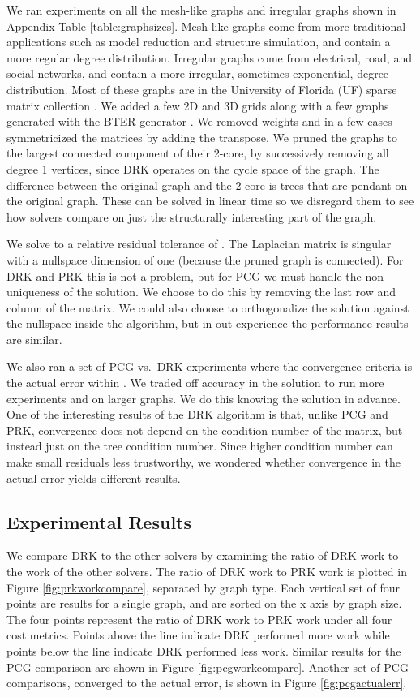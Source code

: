 \documentclass{sig-alternate}
\begin{document}
We ran experiments on all the mesh-like graphs
and irregular graphs shown in Appendix Table \ref{table:graphsizes}.
Mesh-like graphs come from more traditional applications
such as model reduction and
structure simulation, and contain a more regular degree distribution.
Irregular graphs come from electrical, road, and social networks, and
contain a more irregular, sometimes exponential, degree distribution.
Most of these graphs are in the University of Florida (UF)
sparse matrix collection \cite{DavisHu2011}.
We added a few 2D and 3D grids along with a few graphs generated with
the BTER generator \cite{KPPS2014}.
We removed weights and in a few cases symmetricized the matrices by
adding the transpose.
We pruned the graphs to the largest connected component of
their 2-core, by successively removing
all degree 1 vertices, since DRK operates
on the cycle space of the graph.
The difference between the original graph and the 2-core
is trees that are pendant on the original graph. These can be solved in linear
time so we disregard them to see how solvers compare on just
the structurally interesting
part of the graph.



We solve to a relative residual tolerance of .
The Laplacian matrix is singular with a nullspace dimension of one
(because the pruned graph is connected).
For DRK and PRK this is not a problem, but for PCG we must handle
the non-uniqueness of the solution.
We choose to do this
by removing the last row and column of the matrix.
We could also choose to orthogonalize the solution against
the nullspace inside the algorithm, but
in out experience the performance results are similar.


We also
ran a set of PCG vs.\ DRK experiments where the convergence criteria
is the actual error within .
We traded off accuracy in the solution to run more
experiments and on larger graphs.
We do this knowing the solution in advance.
One of the interesting results
of the DRK algorithm is that, unlike PCG and PRK,
convergence does not depend on the condition
number of the matrix, but instead just on the tree condition number.
Since higher condition number can make small residuals
less trustworthy, we wondered whether convergence in
the actual error yields different results.

\subsection{Experimental Results} 
We compare DRK to the other solvers by examining the ratio
of DRK work to the work of the other solvers.
The ratio of DRK work to PRK
work is plotted in Figure \ref{fig:prkworkcompare},
separated by graph type.
Each vertical set of four points are results for
a single graph, and are sorted on the x axis by graph size.
The four points represent the ratio
of DRK work to PRK work under all four cost metrics.
Points above the line indicate DRK performed more work while
points below the line indicate DRK performed less work.
Similar results for the PCG comparison are shown
in Figure \ref{fig:pcgworkcompare}.
Another set of PCG comparisons, converged to the actual
error, is shown in Figure \ref{fig:pcgactualerr}.
\end{document}

